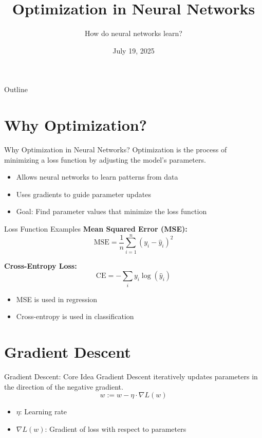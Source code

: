 \documentclass{beamer}
\title{Optimization in Neural Networks}
\subtitle{How do neural networks learn?}
\date{July 19, 2025}
\begin{document}
{
\begin{frame}
    \titlepage
\end{frame}
}

\begin{frame}{Outline}
    \tableofcontents
\end{frame}

\section{Why Optimization?}
\begin{frame}{Why Optimization in Neural Networks?}
Optimization is the process of minimizing a loss function by adjusting the model's parameters.
\begin{itemize}
    \item Allows neural networks to learn patterns from data
    \item Uses gradients to guide parameter updates
    \item Goal: Find parameter values that minimize the loss function
\end{itemize}
\end{frame}

\begin{frame}{Loss Function Examples}
\textbf{Mean Squared Error (MSE):}
\[
\text{MSE} = \frac{1}{n} \sum_{i=1}^n (y_i - \hat{y}_i)^2
\]

\textbf{Cross-Entropy Loss:}
\[
\text{CE} = -\sum_i y_i \log(\hat{y}_i)
\]
\begin{itemize}
    \item MSE is used in regression
    \item Cross-entropy is used in classification
\end{itemize}
\end{frame}

\section{Gradient Descent}
\begin{frame}{Gradient Descent: Core Idea}
Gradient Descent iteratively updates parameters in the direction of the negative gradient.
\[
w := w - \eta \cdot \nabla L(w)
\]
\begin{itemize}
    \item \( \eta \): Learning rate
    \item \( \nabla L(w) \): Gradient of loss with respect to parameters
\end{itemize}
\end{frame}
\end{document}
